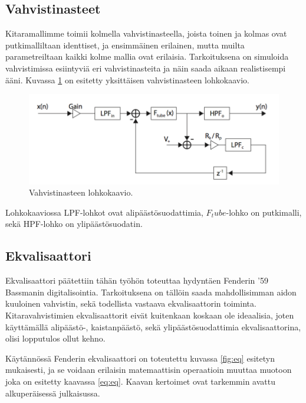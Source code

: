 \documentclass[11pt, a4paper, oneside]{article}
\begin{document}
	

 \subsection{Vahvistinasteet}
 
 Kitaramallimme toimii kolmella vahvistinasteella, joista toinen ja kolmas ovat putkimalliltaan identtiset, ja ensimmäinen erilainen, mutta muilta parametreiltaan kaikki kolme mallia ovat erilaisia.
 Tarkoituksena on simuloida vahvistimissa esiintyviä eri vahvistinasteita ja näin saada aikaan realistisempi ääni.
 Kuvassa \ref{fig:drive} on esitetty yksittäisen vahvistinasteen lohkokaavio. 
 
\begin{figure}[h!]
\includegraphics[width=1\textwidth, center]{drive.png} \newline
\caption{Vahvistinasteen lohkokaavio.}
\label{fig:drive}
\end{figure}

Lohkokaaviossa LPF-lohkot ovat alipäästösuodattimia, $F_tube$-lohko on putkimalli, sekä HPF-lohko on ylipäästösuodatin. 
 
 \subsection{Ekvalisaattori}

Ekvalisaattori päätettiin tähän työhön toteuttaa hydyntäen Fenderin '59 Bassmanin digitalisointia. 
Tarkoituksena on tällöin saada mahdollisimman aidon kuuloinen vahvistin, sekä todellista vastaava ekvalisaattorin toiminta. 
Kitaravahvistimien ekvalisaattorit eivät kuitenkaan koskaan ole ideaalisia, joten käyttämällä alipäästö-, kaistanpäästö, sekä ylipäästösuodattimia ekvalisaattorina, olisi lopputulos ollut kehno. \cite{fender}

Käytännössä Fenderin ekvalisaattori on toteutettu kuvassa \ref{fig:eq} esitetyn mukaisesti, ja se voidaan erilaisin matemaattisin operaatioin muuttaa muotoon joka on esitetty kaavassa \ref{eq:eq}. 
Kaavan kertoimet ovat tarkemmin avattu alkuperäisessä julkaisussa. \cite{fender}
\end{document}
